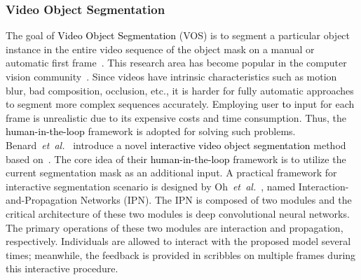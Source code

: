 \documentclass{article}
\newcommand\etal{\emph{et~al.}}
\newcommand{\REO}[1]{\textcolor{black}{#1}}
\newcommand{\ZJH}[1]{\textcolor{black}{#1}}
\begin{document}
\subsubsection{Video Object Segmentation}
The goal of \ZJH{Video Object Segmentation} (VOS) is to segment a particular object instance in the entire video sequence of the object mask on a manual or automatic first frame~\cite{yao2020video}. This research area has become popular in the computer vision community~\cite{caelles2017one}. Since videos have intrinsic characteristics such as motion blur, bad composition, occlusion, etc., it is harder for fully automatic approaches to segment more complex sequences accurately.
Employing user \ZJH{to} input for each frame is unrealistic due to its expensive costs and time consumption. Thus, the \REO{human-in-the-loop} framework is adopted for solving such problems. Benard~\etal~\cite{benard2017interactive} introduce a novel \ZJH{interactive video object segmentation} method based on~\cite{xu2016deep}. The core idea of their \REO{human-in-the-loop} framework is to utilize the current segmentation mask as an additional input. A practical framework for interactive segmentation scenario is designed by Oh~\etal~\cite{oh2019fast}, named Interaction-and-Propagation Networks (IPN). The IPN is composed of two modules and the critical architecture of these two modules is deep convolutional neural networks. The primary operations of these two modules are interaction and propagation, respectively. Individuals are allowed to interact with the proposed model several times; meanwhile, the feedback is provided in scribbles on multiple frames during this interactive procedure.
\end{document}
